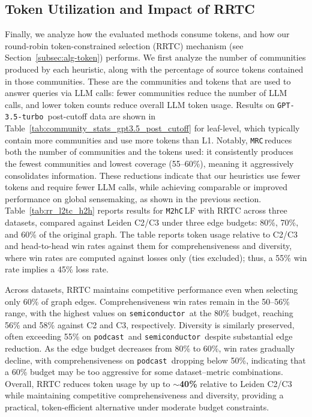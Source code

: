 \documentclass[sigconf]{acmart}
\newcommand{\MHC}{\texttt{M2hC}\,}
\newcommand{\MRC}{\texttt{MRC}\,}
\newcommand{\threepointfive}{\texttt{GPT-3.5-turbo\,}}
\newcommand{\podcast}{\texttt{podcast\,}}
\newcommand{\semi}{\texttt{semiconductor\,}}
\begin{document}
\subsection{Token Utilization and Impact of RRTC} \label{subsec:token}

Finally, we analyze how the evaluated methods consume tokens, and how our round-robin token-constrained selection (RRTC) mechanism (see Section~\ref{subsec:alg-token}) performs.
We first analyze the number of communities produced by each heuristic, along with the percentage of source tokens contained in those communities. These are the communities and tokens that are used to answer queries via LLM calls: fewer communities reduce the number of LLM calls, and lower token counts reduce overall LLM token usage.
Results on \threepointfive post-cutoff data are shown in Table~\ref{tab:community_stats_gpt3.5_post_cutoff} for leaf-level, which typically contain more communities and use more tokens than L1.
Notably, \MRC reduces both the number of communities and the tokens used: it consistently produces the fewest communities and lowest coverage (55–60\%), meaning it aggressively consolidates information.
 These reductions indicate that our heuristics use fewer tokens and require fewer LLM calls, while achieving comparable or improved performance on global sensemaking, as shown in the previous section.\\

Table~\ref{tab:rr_l2tc_h2h} reports results for \MHC LF with RRTC across three datasets, compared against Leiden C2/C3 under three edge budgets: 80\%, 70\%, and 60\% of the original graph. 
The table reports token usage relative to C2/C3 and head-to-head win rates against them for comprehensiveness and diversity, where win rates are computed against losses only (ties excluded); thus, a 55\% win rate implies a 45\% loss rate.

Across datasets, RRTC maintains competitive performance even when selecting only 60\% of graph edges. Comprehensiveness win rates remain in the 50--56\% range, with the highest values on \semi at the 80\% budget, reaching 56\% and 58\% against C2 and C3, respectively.
Diversity is similarly preserved, often exceeding 55\% on \podcast and \semi despite substantial edge reduction. 
As the edge budget decreases from 80\% to 60\%, win rates gradually decline, with comprehensiveness on \podcast dropping below 50\%, indicating that a 60\%
budget may be too aggressive for some dataset--metric combinations. 
Overall, RRTC reduces token usage by up to $\sim$\textbf{40\%} relative to Leiden C2/C3 while maintaining competitive comprehensiveness and diversity, providing a practical, token-efficient alternative under moderate budget constraints.
\end{document}
